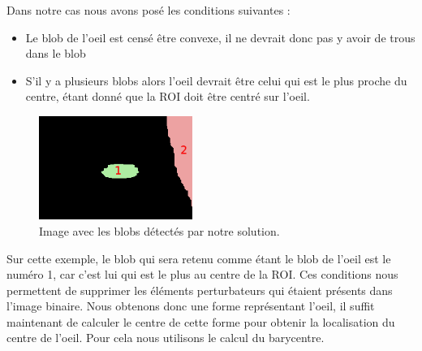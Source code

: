 Dans notre cas nous avons posé les conditions suivantes :
\begin{itemize}
 \item Le blob de l'oeil est censé être convexe, il ne devrait donc pas y avoir de trous dans le blob
 \item S'il y a plusieurs blobs alors l'oeil devrait être celui qui est le plus proche du centre, étant
 donné que la ROI doit être centré sur l'oeil.
\end{itemize}

\begin{figure}[H]
  \centering
  \includegraphics[width=5cm]{image/ycbcr_bin_open_blob.png}
  \caption{Image avec les blobs détectés par notre solution.}
\end{figure}

Sur cette exemple, le blob qui sera retenu comme étant le blob de l'oeil est le numéro 1, car c'est lui
qui est le plus au centre de la ROI. Ces conditions nous permettent de supprimer les éléments perturbateurs qui étaient présents dans l'image binaire.
Nous obtenons donc une forme représentant l'oeil, il suffit maintenant de calculer le centre de cette forme
pour obtenir la localisation du centre de l'oeil. Pour cela nous utilisons le calcul du barycentre.